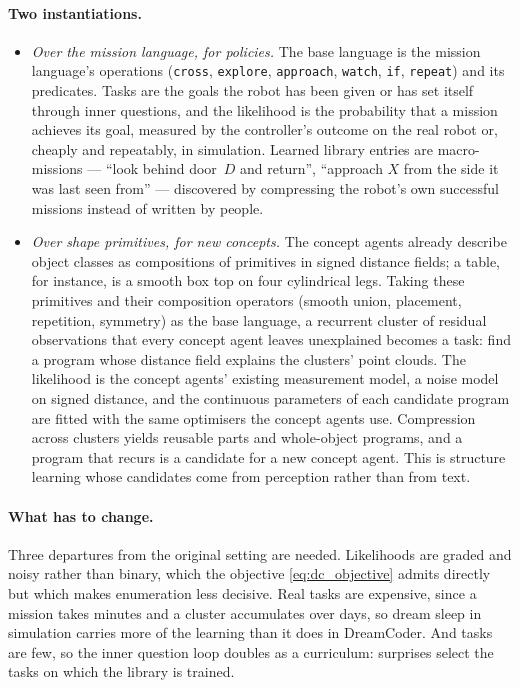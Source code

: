 \paragraph{Two instantiations.}
\begin{itemize}
    \item \emph{Over the mission language, for policies.} The base language is the mission language's operations
    (\texttt{cross}, \texttt{explore}, \texttt{approach}, \texttt{watch}, \texttt{if}, \texttt{repeat}) and its
    predicates. Tasks are the goals the robot has been given or has set itself through inner questions, and the
    likelihood is the probability that a mission achieves its goal, measured by the controller's outcome on the
    real robot or, cheaply and repeatably, in simulation. Learned library entries are macro-missions --- ``look
    behind door~$D$ and return'', ``approach $X$ from the side it was last seen from'' --- discovered by compressing
    the robot's own successful missions instead of written by people.
    \item \emph{Over shape primitives, for new concepts.} The concept agents already describe object classes as
    compositions of primitives in signed distance fields; a table, for instance, is a smooth box top on four
    cylindrical legs. Taking these primitives and their composition operators (smooth union, placement, repetition,
    symmetry) as the base language, a recurrent cluster of residual observations that every concept agent leaves
    unexplained becomes a task: find a program whose distance field explains the clusters' point clouds. The
    likelihood is the concept agents' existing measurement model, a noise model on signed distance, and the
    continuous parameters of each candidate program are fitted with the same optimisers the concept agents use.
    Compression across clusters yields reusable parts and whole-object programs, and a program that recurs is a
    candidate for a new concept agent. This is structure learning whose candidates come from perception rather than
    from text.
\end{itemize}

\paragraph{What has to change.}
Three departures from the original setting are needed. Likelihoods are graded and noisy rather than binary, which
the objective \eqref{eq:dc_objective} admits directly but which makes enumeration less decisive. Real tasks are
expensive, since a mission takes minutes and a cluster accumulates over days, so dream sleep in simulation carries
more of the learning than it does in DreamCoder. And tasks are few, so the inner question loop doubles as a
curriculum: surprises select the tasks on which the library is trained.

